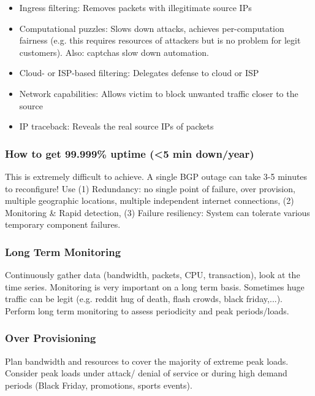 \documentclass[11pt,oneside,a4paper]{article}
\begin{document}
\begin{itemize}
	\setlength{\itemsep}{0pt}
	\setlength{\parskip}{0pt}
	\item Ingress filtering: Removes packets with illegitimate source IPs
	\item Computational puzzles: Slows down attacks, achieves per-computation fairness (e.g. this requires resources of attackers but is no problem for legit customers). Also: captchas slow down automation.
	\item Cloud- or ISP-based filtering: Delegates defense to cloud or ISP
	\item Network capabilities: Allows victim to block unwanted traffic closer to the source
	\item IP traceback:	Reveals the real source IPs of packets
\end{itemize}
\vspace{-\topsep}

\subsubsection{How to get 99.999\% uptime (\textless 5 min down/year)}

This is extremely difficult to achieve. A single BGP outage can take 3-5 minutes to reconfigure! Use (1) Redundancy: no single point of failure, over provision, multiple geographic locations, multiple independent internet connections, (2) Monitoring \& Rapid detection, (3) Failure resiliency: System can tolerate various temporary component failures.

\subsubsection{Long Term Monitoring}

Continuously gather data (bandwidth, packets, CPU, transaction), look at the time series. Monitoring is very important on a long term basis. Sometimes huge traffic can be legit (e.g. reddit hug of death, flash crowds, black friday,...). Perform long term monitoring to assess periodicity and peak periods/loads.

\subsubsection{Over Provisioning}

Plan bandwidth and resources to cover the majority of extreme peak loads. Consider peak loads under attack/ denial of service or during high demand periods (Black Friday, promotions,
sports events).
\end{document}
